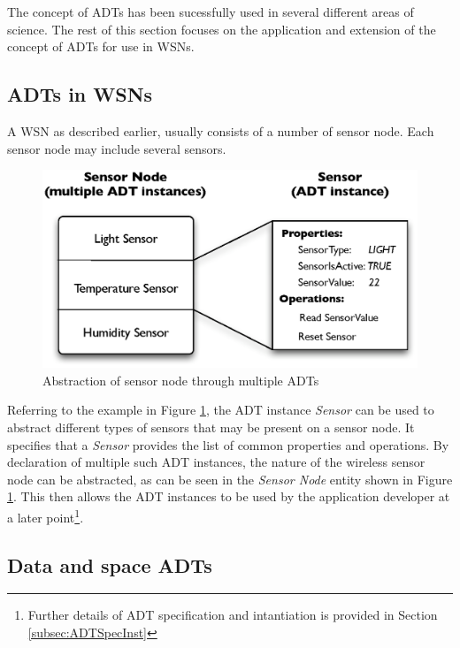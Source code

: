 The concept of ADTs has been sucessfully used in several different areas of
science. The rest of this section focuses on the application and
extension of the concept of ADTs for use in WSNs.

\subsection{ADTs in WSNs} \label{subsubsec:ADTsinWSN}

A WSN as described earlier, usually consists of a number of sensor node. Each
sensor node may include several sensors.

\begin{figure}
\centering
\includegraphics[scale=0.71]{img/ADTsMultipleInstances.eps}
\caption[Abstraction of sensor node through multiple ADTs]{Abstraction of sensor node through multiple ADTs}
\label{Fig:MultipleADTs}
\end{figure} 
  
Referring to the example in Figure \ref{Fig:MultipleADTs}, the ADT instance \emph{Sensor} can be used to abstract different types of sensors
that may be present on a sensor node. It specifies that a \emph{Sensor}
provides the list of common properties and operations. 
By declaration of multiple such ADT instances, the nature of the
wireless sensor node can be abstracted, as can be seen in the \emph{Sensor Node} entity shown in
Figure \ref{Fig:MultipleADTs}. This then allows the ADT instances to be used by the application
developer at a later point\footnote{Further details of ADT specification and
intantiation is provided in Section \ref{subsec:ADTSpecInst}}.

\subsection{Data and space ADTs} \label{subsubsec:DataAndSpaceADTs}

